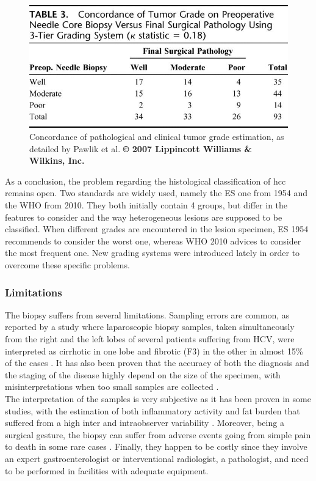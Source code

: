 \begin{figure}[th!]
\centering
\includegraphics[width=0.7\linewidth]{../HistologicalGradePrediction/images/pawlik_table3}
\caption{Concordance of pathological and clinical tumor grade estimation, as detailed by Pawlik et al. \textbf{© 2007 Lippincott Williams \& Wilkins, Inc. \cite{Pawlik2007}}}
\label{fig:pawlik_table3}
\end{figure}

As a conclusion, the problem regarding the histological classification
of \ac{hcc} remains open. Two standards are widely used, namely the ES one
from 1954 and the WHO from 2010. They both initially contain 4 groups,
but differ in the features to consider and the way heterogeneous lesions
are supposed to be classified. When different grades are encountered in
the lesion specimen, ES 1954 recommends to consider the worst one,
whereas WHO 2010 advices to consider the most frequent one. New
grading systems were introduced lately in order to overcome these
specific problems.

\subsubsection{Limitations}\label{biopsy-limitation}

The biopsy suffers from several limitations. Sampling errors
are common, as reported by a study where laparoscopic biopsy samples,
taken simultaneously from the right and the left lobes of several
patients suffering from HCV, were interpreted as cirrhotic in one lobe
and fibrotic (F3) in the other in almost 15\% of the cases \cite{Regev2002}. It has also been proven that the
accuracy of both the diagnosis and the staging of the disease highly
depend on the size of the specimen, with misinterpretations when too
small samples are collected \cite{Colloredo2003}.\\
The interpretation of the samples is very subjective as it has been
proven in some studies, with the estimation of both inflammatory
activity and fat burden that suffered from a high inter and
intraobserver variability \cite{Bedossa1994}.
Moreover, being a surgical gesture, the biopsy can suffer from adverse
events going from simple pain to death in some rare cases \cite{Rockey2009, Castera2001, Seeff2010, Piccinino1986}. Finally, they happen to be costly since
they involve an expert gastroenterologist or interventional radiologist, a pathologist,
and need to be performed in facilities with adequate equipment.

